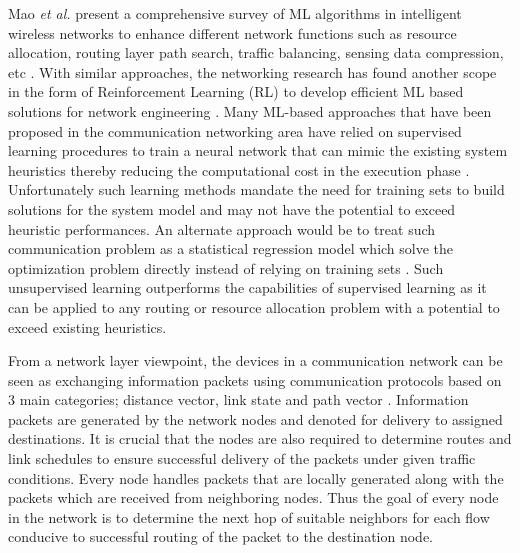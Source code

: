 \documentclass[lettersize,journal]{IEEEtran}
\begin{document}
Mao \textit{et al.} present a comprehensive survey of ML algorithms in intelligent wireless networks to enhance different network functions such as resource allocation, routing layer path search, traffic balancing, sensing data compression, etc \cite{mao2018deep}. With similar approaches, the networking research has found another scope in the form of Reinforcement Learning (RL) to develop efficient ML based solutions for network engineering \cite{bernardez2023magnneto, valadarsky2017learning, xu2018experience, geng2020multi}. Many ML-based approaches that have been proposed in the communication networking area have relied on supervised learning procedures to train a neural network that can mimic the existing system heuristics thereby reducing the computational cost in the execution phase \cite{sun2017learning, lei2017deep,xu2019energy, van2019sum}. Unfortunately such learning methods mandate the need for training sets to build solutions for the system model and may not have the potential to exceed heuristic performances. An alternate approach would be to treat such communication problem as a statistical regression model which solve the optimization problem directly instead of relying on training sets \cite{eisen2020optimal,de2018team,meng2020power,  cui2019spatial}. Such unsupervised learning outperforms the capabilities of supervised learning as it can be applied to any routing or resource allocation problem with a potential to exceed existing heuristics. %

From a network layer viewpoint, the devices in a communication network can be seen as exchanging information packets using communication protocols based on 3 main categories; distance vector, link state and path vector \cite{MEDHI201864}. Information packets are generated by the network nodes and denoted for delivery to assigned destinations. It is crucial that the nodes are also required to determine routes and link schedules to ensure successful delivery of the packets under given traffic conditions. Every node handles packets that are locally generated along with the packets which are received from neighboring nodes. Thus the goal of every node in the network is to determine the next hop of suitable neighbors for each flow conducive to successful routing of the packet to the destination node. %
\end{document}
